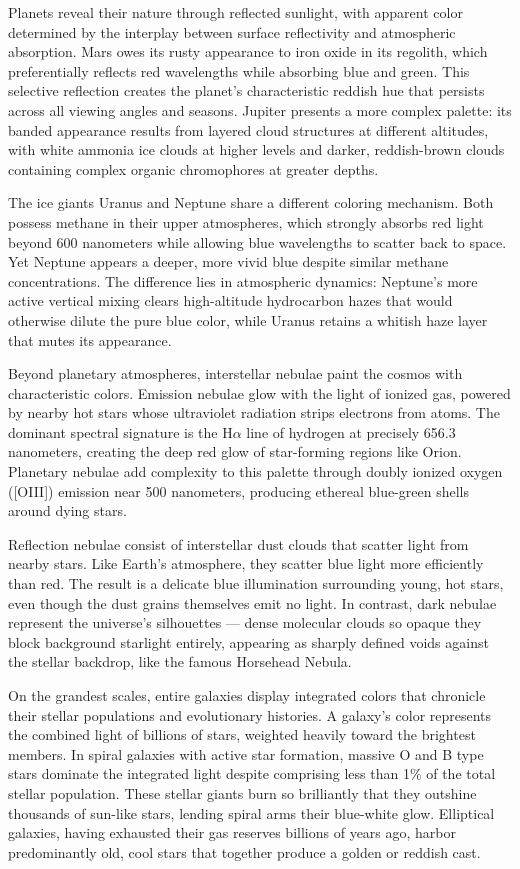 Planets reveal their nature through reflected sunlight, with apparent color determined by the interplay between surface reflectivity and atmospheric absorption. Mars owes its rusty appearance to iron oxide in its regolith, which preferentially reflects red wavelengths while absorbing blue and green. This selective reflection creates the planet's characteristic reddish hue that persists across all viewing angles and seasons. Jupiter presents a more complex palette: its banded appearance results from layered cloud structures at different altitudes, with white ammonia ice clouds at higher levels and darker, reddish-brown clouds containing complex organic chromophores at greater depths.

The ice giants Uranus and Neptune share a different coloring mechanism. Both possess methane in their upper atmospheres, which strongly absorbs red light beyond 600 nanometers while allowing blue wavelengths to scatter back to space. Yet Neptune appears a deeper, more vivid blue despite similar methane concentrations. The difference lies in atmospheric dynamics: Neptune's more active vertical mixing clears high-altitude hydrocarbon hazes that would otherwise dilute the pure blue color, while Uranus retains a whitish haze layer that mutes its appearance.

Beyond planetary atmospheres, interstellar nebulae paint the cosmos with characteristic colors. Emission nebulae glow with the light of ionized gas, powered by nearby hot stars whose ultraviolet radiation strips electrons from atoms. The dominant spectral signature is the H$\alpha$ line of hydrogen at precisely 656.3 nanometers, creating the deep red glow of star-forming regions like Orion. Planetary nebulae add complexity to this palette through doubly ionized oxygen ([OIII]) emission near 500 nanometers, producing ethereal blue-green shells around dying stars.

Reflection nebulae consist of interstellar dust clouds that scatter light from nearby stars. Like Earth's atmosphere, they scatter blue light more efficiently than red. The result is a delicate blue illumination surrounding young, hot stars, even though the dust grains themselves emit no light. In contrast, dark nebulae represent the universe's silhouettes — dense molecular clouds so opaque they block background starlight entirely, appearing as sharply defined voids against the stellar backdrop, like the famous Horsehead Nebula.

On the grandest scales, entire galaxies display integrated colors that chronicle their stellar populations and evolutionary histories. A galaxy's color represents the combined light of billions of stars, weighted heavily toward the brightest members. In spiral galaxies with active star formation, massive O and B type stars dominate the integrated light despite comprising less than 1\% of the total stellar population. These stellar giants burn so brilliantly that they outshine thousands of sun-like stars, lending spiral arms their blue-white glow. Elliptical galaxies, having exhausted their gas reserves billions of years ago, harbor predominantly old, cool stars that together produce a golden or reddish cast.

